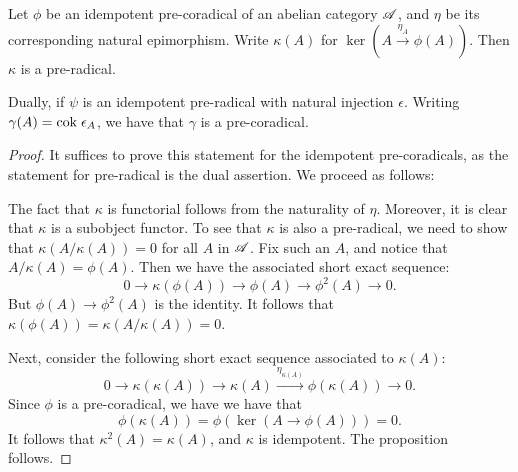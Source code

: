 \begin{prop}\label{prop_rad_eq_corad}
Let $\phi$ be an idempotent pre-coradical of an abelian category
$\mathscr{A}$, and $\eta$ be its 
corresponding natural epimorphism. Write $\kappa(A)$ for $\ker (A 
\stackrel{\eta_A}{\to} \phi(A))$. Then $\kappa$ is a pre-radical.

Dually, if $\psi$ is an idempotent pre-radical with natural 
injection $\epsilon$. Writing $\gamma(A) = \mathrm{cok}\; \epsilon_A$, we 
have that $\gamma$ is a pre-coradical.
\end{prop}
\begin{proof}
It suffices to prove this statement for the idempotent 
pre-coradicals, as the statement for pre-radical is 
the dual assertion. We proceed as follows:

The fact that $\kappa$ is functorial follows from the naturality 
of $\eta$. Moreover, it is clear that $\kappa$ is a subobject 
functor. To see that $\kappa$ is also a pre-radical, we need to 
show that $\kappa(A/\kappa(A)) = 0$ for all $A$ in $\mathscr{A}$. Fix 
such an $A$, and notice that $A/\kappa(A) = \phi(A)$. Then we have 
the associated short exact sequence:
\[
0 \to \kappa(\phi(A)) \to \phi(A) \to \phi^2(A) \to 0.
\]
But $\phi(A) \to \phi^2(A)$ is the identity. It follows that 
$\kappa(\phi(A)) = \kappa(A/\kappa(A)) = 0$.

Next, consider the following short exact sequence associated to 
$\kappa(A)$:
\[
0 \to \kappa(\kappa(A)) \to \kappa(A) 
   \stackrel{\eta_{\kappa(A)}}{\to} \phi(\kappa(A)) \to 0.
\]
Since $\phi$ is a pre-coradical, we have we have that
\[
\phi(\kappa(A)) = \phi(\ker(A \to \phi(A))) = 0.
\]
It follows that $\kappa^2(A) = \kappa(A)$, and $\kappa$ is 
idempotent. The proposition follows.
\end{proof}

